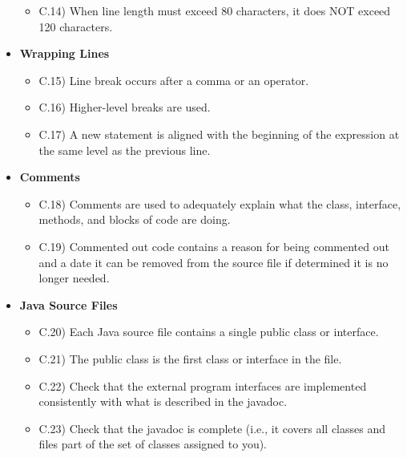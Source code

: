 \documentclass[../../codeInspection.tex]{subfiles}
\begin{document}
\begin{itemize}
\begin{itemize}
							\item C.14) When line length must exceed 80 characters, it does NOT exceed 120 characters.

						\end{itemize}

				\item 	\textbf{Wrapping Lines}
						\begin{itemize}

							\item C.15) Line break occurs after a comma or an operator.

							\item C.16) Higher-level breaks are used.

							\item C.17) A new statement is aligned with the beginning of the expression at the same level as the previous line.

						\end{itemize}

				\item 	\textbf{Comments}
						\begin{itemize}

							\item C.18) Comments are used to adequately explain what the class, interface, methods, and blocks of code are doing.

							\item C.19) Commented out code contains a reason for being commented out and a date it can be removed from the source file if determined it is no longer needed.

						\end{itemize}
				
				\item 	\textbf{Java Source Files}
						\begin{itemize}

							\item C.20) Each Java source file contains a single public class or interface.

							\item C.21) The public class is the first class or interface in the file.

							\item C.22) Check that the external program interfaces are implemented consistently with what is described in the javadoc.

							\item C.23) Check that the javadoc is complete (i.e., it covers all classes and files part of the set of classes assigned to you).


\end{itemize}
\end{itemize}
\end{document}
